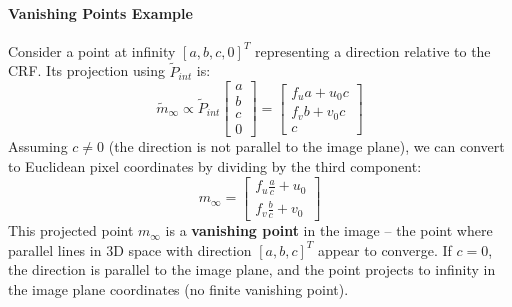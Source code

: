 \paragraph{Vanishing Points Example}
Consider a point at infinity $[a, b, c, 0]^T$ representing a direction relative to the CRF. Its projection using $\tilde{P}_{int}$ is:
\[
\tilde{m}_{\infty} \propto \tilde{P}_{int}
\begin{bmatrix} a \\ b \\ c \\ 0 \end{bmatrix}
=
\begin{bmatrix}
  f_u a + u_0 c \\
  f_v b + v_0 c \\
  c
\end{bmatrix}
\]
Assuming $c \neq 0$ (the direction is not parallel to the image plane), we can convert to Euclidean pixel coordinates by dividing by the third component:
\[
m_{\infty} = \begin{bmatrix} f_u \frac{a}{c} + u_0 \\ f_v \frac{b}{c} + v_0 \end{bmatrix}
\]
This projected point $m_{\infty}$ is a \textbf{vanishing point} in the image – the point where parallel lines in 3D space with direction $[a, b, c]^T$ appear to converge. If $c=0$, the direction is parallel to the image plane, and the point projects to infinity in the image plane coordinates (no finite vanishing point).


